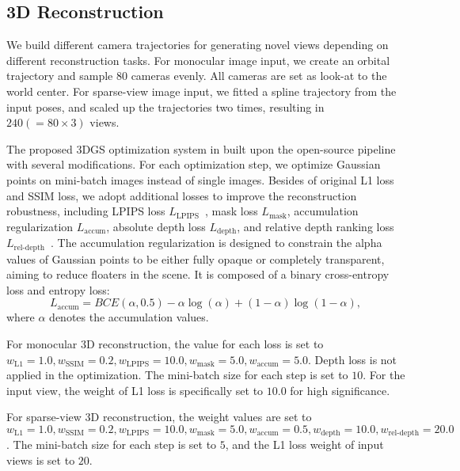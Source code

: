 \subsection{3D Reconstruction}
 We build different camera trajectories for generating novel views depending on different reconstruction tasks. For monocular image input, we create an orbital trajectory and sample 80 cameras evenly. All cameras are set as look-at to the world center. For sparse-view image input, we fitted a spline trajectory from the input poses, and scaled up the trajectories two times, resulting in $240 (=80 \times 3)$ views.

 The proposed 3DGS optimization system in built upon the open-source pipeline~\cite{nerfstudio} with several modifications. For each optimization step, we optimize Gaussian points on mini-batch images instead of single images. Besides of original L1 loss and SSIM loss, we adopt additional losses to improve the reconstruction robustness, including LPIPS loss $L_{\textrm{LPIPS}}$~\cite{zhang2018perceptual}, mask loss $L_{\textrm{mask}}$, accumulation regularization $L_{\textrm{accum}}$, absolute depth loss $L_{\textrm{depth}}$, and relative depth ranking loss $L_{\textrm{rel-depth}}$~\cite{wang2023sparsenerf}. The accumulation regularization is designed to constrain the alpha values of Gaussian points to be either fully opaque or completely transparent, aiming to reduce floaters in the scene. It is composed of a binary cross-entropy loss and entropy loss:
\begin{equation*}
    L_{\textrm{accum}} = BCE(\alpha, 0.5) -\alpha \log(\alpha) + (1-\alpha) \log(1-\alpha),
\end{equation*}
where $\alpha$ denotes the accumulation values. 


For monocular 3D reconstruction, the value for each loss is set to $w_{\textrm{L1}}=1.0, w_{\textrm{SSIM}}=0.2, w_{\textrm{LPIPS}}=10.0, w_{\textrm{mask}}=5.0, w_{\textrm{accum}}=5.0$. Depth loss is not applied in the optimization. The mini-batch size for each step is set to $10$. For the input view, the weight of L1 loss is specifically set to $10.0$ for high significance. 

For sparse-view 3D reconstruction, the weight values are set to $w_{\textrm{L1}}=1.0, w_{\textrm{SSIM}}=0.2, w_{\textrm{LPIPS}}=10.0, w_{\textrm{mask}}=5.0, w_{\textrm{accum}}=0.5, w_{\textrm{depth}}=10.0, w_{\textrm{rel-depth}}=20.0$. The mini-batch size for each step is set to $5$, and the L1 loss weight of input views is set to $20$. 

